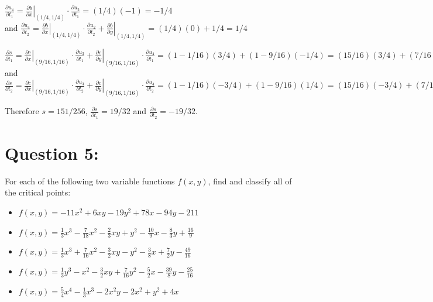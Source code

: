 \documentclass{article}
\newcommand{\at}[1]{\left. #1 \right|}
\newcommand{\partdiff}[2]{\frac{\partial #1}{\partial #2}}
\newcommand{\dr}[1]{\textcolor{dark_red}{#1}}
\begin{document}
\vspace{0.4cm}

\dr{\(\partdiff{u_4}{t_1} = \at{\partdiff{b}{x}}_{(1/4,1/4)}\cdot\partdiff{u_2}{t_1} = (1/4)(-1) = -1/4\) \\ and 
\(\partdiff{u_4}{t_2} = \at{\partdiff{b}{x}}_{(1/4,1/4)}\cdot\partdiff{u_2}{t_2} + \at{\partdiff{b}{y}}_{(1/4,1/4)} = (1/4)(0) + 1/4 = 1/4\)}

\vspace{0.4cm}

\dr{\(\partdiff{s}{t_1} = \at{\partdiff{c}{x}}_{(9/16,1/16)}\cdot\partdiff{u_3}{t_1} + \at{\partdiff{c}{y}}_{(9/16,1/16)}\cdot\partdiff{u_4}{t_1} = (1 - 1/16)(3/4) + (1 - 9/16)(-1/4) = (15/16)(3/4) + (7/16)(-1/4) = (45 - 7)/64 = 38/64 = 19/32\) \\ and 
\(\partdiff{s}{t_2} = \at{\partdiff{c}{x}}_{(9/16,1/16)}\cdot\partdiff{u_3}{t_2} + \at{\partdiff{c}{y}}_{(9/16,1/16)}\cdot\partdiff{u_4}{t_2} = (1 - 1/16)(-3/4) + (1 - 9/16)(1/4) = (15/16)(-3/4) + (7/16)(1/4) = (-45 + 7)/64 = -38/64 = -19/32\)}

\vspace{0.4cm}

\dr{Therefore \(s = 151/256\), \(\partdiff{s}{t_1} = 19/32\) and \(\partdiff{s}{t_2} = -19/32\).}



\section*{Question 5:}

For each of the following two variable functions \(f(x,y)\), find and classify all of the critical points:

\begin{itemize}
\item \(f(x,y) = -11x^2 + 6xy - 19y^2 + 78x - 94y - 211\)
\item \(f(x,y) = \frac{1}{3}x^3 - \frac{7}{18}x^2 - \frac{2}{3}xy + y^2 - \frac{10}{9}x - \frac{8}{3}y + \frac{16}{9}\)
\item \(f(x,y) = \frac{1}{3}x^3 + \frac{7}{16}x^2 - \frac{3}{2}xy - y^2 - \frac{3}{8}x + \frac{7}{2}y - \frac{49}{16}\)
\item \(f(x,y) = \frac{1}{3}y^3 - x^2 - \frac{3}{2}xy + \frac{7}{16}y^2 - \frac{5}{2}x - \frac{39}{8}y - \frac{25}{16}\)
\item \(f(x,y) = \frac{5}{4}x^4 - \frac{1}{3}x^3 - 2x^2y - 2x^2 + y^2 + 4x\)
\end{itemize}
\end{document}
